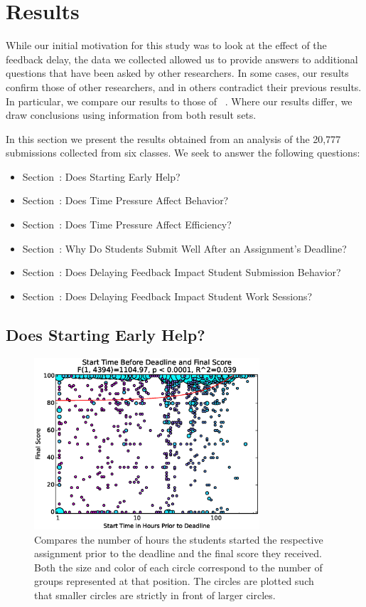 \section{Results}
While our initial motivation for this study was to look at the effect of the
feedback delay, the data we collected allowed us to provide answers to
additional questions that have been asked by other researchers. In some cases,
our results confirm those of other researchers, and in others contradict their
previous results. In particular, we compare our results to those of
\spacco{}~\cite{Spacco:2013:TIP:2462476.2465594}. Where our results differ, we
draw conclusions using information from both result sets.

In this section we present the results obtained from an analysis of the 20,777
submissions collected from six classes. We seek to answer the following
questions:

\begin{itemize}
\item Section~: Does Starting Early Help?
\item Section~: Does Time Pressure Affect Behavior?
\item Section~: Does Time Pressure Affect Efficiency?
\item Section~: Why Do Students Submit Well After an
  Assignment's Deadline?
\item Section~: Does Delaying Feedback Impact Student
  Submission Behavior?
\item Section~: Does Delaying Feedback Impact Student
  Work Sessions?
\end{itemize}

\subsection{Does Starting Early Help?}

\begin{figure}[!t]
\centering \includegraphics[width=3.3in]{graphs/Start_Time_Before_Deadline_and_Final_Score.eps}
\caption{Compares the number of hours the students started the respective
  assignment prior to the deadline and the final score they received. Both the
  size and color of each circle correspond to the number of groups represented
  at that position. The circles are plotted such that smaller circles are
  strictly in front of larger circles.}
\end{figure}

